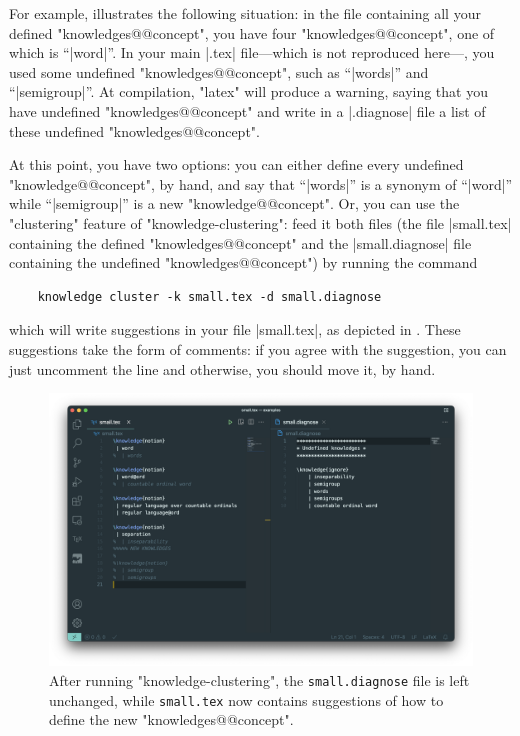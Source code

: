 \documentclass{article}
\begin{document}
For example,  illustrates the following situation:
in the file containing all your defined "knowledges@@concept", you have
four "knowledges@@concept", one of which is ``\spverb|word|''.
In your main \spverb|.tex| file---which is not reproduced here---, you used some 
undefined "knowledges@@concept", such as ``\spverb|words|'' and
``\spverb|semigroup|''.
At compilation, "latex" will produce a warning, saying that you have undefined
"knowledges@@concept" and write in a \spverb|.diagnose| file a list
of these undefined "knowledges@@concept".

At this point, you have two options: you can either define every undefined "knowledge@@concept", by hand, and say that ``\spverb|words|'' is a synonym of
``\spverb|word|'' while ``\spverb|semigroup|'' is a new "knowledge@@concept".
Or, you can use the "clustering" feature of "knowledge-clustering": feed
it both files (the file \spverb|small.tex| containing the defined 
"knowledges@@concept" and
the \spverb|small.diagnose| file containing the undefined "knowledges@@concept")
by running the command
\begin{verbatim}
    knowledge cluster -k small.tex -d small.diagnose
\end{verbatim}
which will write suggestions in your file \spverb|small.tex|,
as depicted in . These suggestions
take the form of comments: if you agree with the suggestion, you can just
uncomment the line and otherwise, you should move it, by hand.

\begin{figure}[htb]
    \centering
    \includegraphics[width=.95\textwidth]{img/small-after.png}
    \caption{%
        \label{fig:clustering-after}
        After running "knowledge-clustering", the \texttt{small.diagnose} file
        is left unchanged, while \texttt{small.tex} now contains suggestions
        of how to define the new "knowledges@@concept".
     }
\end{figure}
\end{document}
